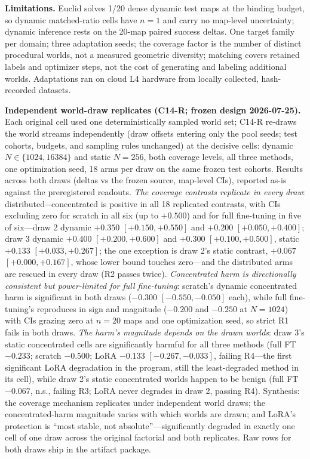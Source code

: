 \documentclass[letterpaper]{article} %
\begin{document}
\textbf{Limitations.} Euclid solves 1/20 dense dynamic test maps at the binding budget, so dynamic matched-ratio cells have $n{=}1$ and carry no map-level uncertainty; dynamic inference rests on the 20-map paired success deltas. One target family per domain; three adaptation seeds; the coverage factor is the number of distinct procedural worlds, not a measured geometric diversity; matching covers retained labels and optimizer steps, not the cost of generating and labeling additional worlds. Adaptations ran on cloud L4 hardware from locally collected, hash-recorded datasets.

\textbf{Independent world-draw replicates (C14-R; frozen design 2026-07-25).} Each original cell used one deterministically sampled world set; C14-R re-draws the world streams independently (draw offsets entering only the pool seeds; test cohorts, budgets, and sampling rules unchanged) at the decisive cells: dynamic $N \in \{1024, 16384\}$ and static $N{=}256$, both coverage levels, all three methods, one optimization seed, 18 arms per draw on the same frozen test cohorts. Results across both draws (deltas vs the frozen source, map-level CIs), reported as-is against the preregistered readouts. \emph{The coverage contrasts replicate in every draw}: distributed$-$concentrated is positive in all 18 replicated contrasts, with CIs excluding zero for scratch in all six (up to $+0.500$) and for full fine-tuning in five of six---draw 2 dynamic $+0.350$ $[+0.150,+0.550]$ and $+0.200$ $[+0.050,+0.400]$; draw 3 dynamic $+0.400$ $[+0.200,+0.600]$ and $+0.300$ $[+0.100,+0.500]$, static $+0.133$ $[+0.033,+0.267]$; the one exception is draw 2's static contrast, $+0.067$ $[+0.000,+0.167]$, whose lower bound touches zero---and the distributed arms are rescued in every draw (R2 passes twice). \emph{Concentrated harm is directionally consistent but power-limited for full fine-tuning}: scratch's dynamic concentrated harm is significant in both draws ($-0.300$ $[-0.550,-0.050]$ each), while full fine-tuning's reproduces in sign and magnitude ($-0.200$ and $-0.250$ at $N{=}1024$) with CIs grazing zero at $n{=}20$ maps and one optimization seed, so strict R1 fails in both draws. \emph{The harm's magnitude depends on the drawn worlds}: draw 3's static concentrated cells are significantly harmful for all three methods (full FT $-0.233$; scratch $-0.500$; LoRA $-0.133$ $[-0.267,-0.033]$, failing R4---the first significant LoRA degradation in the program, still the least-degraded method in its cell), while draw 2's static concentrated worlds happen to be benign (full FT $-0.067$, n.s., failing R3; LoRA never degrades in draw 2, passing R4). Synthesis: the coverage mechanism replicates under independent world draws; the concentrated-harm magnitude varies with which worlds are drawn; and LoRA's protection is ``most stable, not absolute''---significantly degraded in exactly one cell of one draw across the original factorial and both replicates. Raw rows for both draws ship in the artifact package.
\end{document}
